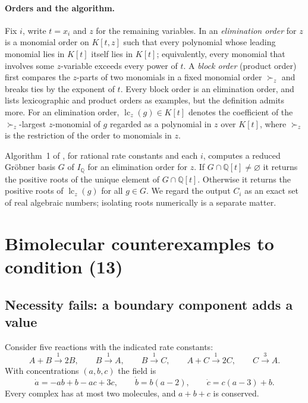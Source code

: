 \documentclass[11pt,a4paper]{article}
\theoremstyle{plain}
\theoremstyle{definition}
\theoremstyle{remark}
\newcommand{\Q}{\mathbb{Q}}
\newcommand{\lc}{\operatorname{lc}}
\begin{document}
\paragraph{Orders and the algorithm.}
Fix $i$, write $t=x_i$ and $z$ for the remaining variables. In \cite[Section~4.1]{acr} an \emph{elimination order} for $z$ is a monomial order on $K[t,z]$ such that every polynomial whose leading monomial lies in $K[t]$ itself lies in $K[t]$; equivalently, every monomial that involves some $z$-variable exceeds every power of $t$. A \emph{block order} (product order) first compares the $z$-parts of two monomials in a fixed monomial order $\succ_z$ and breaks ties by the exponent of $t$. Every block order is an elimination order, and \cite{acr} lists lexicographic and product orders as examples, but the definition admits more. For an elimination order, $\lc_z(g)\in K[t]$ denotes the coefficient of the $\succ_z$-largest $z$-monomial of $g$ regarded as a polynomial in $z$ over $K[t]$, where $\succ_z$ is the restriction of the order to monomials in $z$.

Algorithm~1 of \cite{acr}, for rational rate constants and each $i$, computes a reduced Gr\"obner basis $G$ of $I_\Q$ for an elimination order for $z$. If $G\cap\Q[t]\neq\varnothing$ it returns the positive roots of the unique element of $G\cap\Q[t]$. Otherwise it returns the positive roots of $\lc_z(g)$ for all $g\in G$. We regard the output $C_i$ as an exact set of real algebraic numbers; isolating roots numerically is a separate matter.

\section{Bimolecular counterexamples to condition (13)}\label{sec:counter}

\subsection{Necessity fails: a boundary component adds a value}

Consider five reactions with the indicated rate constants:
\begin{equation}\label{eq:necnet}
A+B\xrightarrow{1}2B,\qquad B\xrightarrow{1}A,\qquad B\xrightarrow{1}C,\qquad A+C\xrightarrow{1}2C,\qquad C\xrightarrow{3}A.
\end{equation}
With concentrations $(a,b,c)$ the field is
\begin{equation}\label{eq:necfield}
\dot a=-ab+b-ac+3c,\qquad \dot b=b(a-2),\qquad \dot c=c(a-3)+b.
\end{equation}
Every complex has at most two molecules, and $a+b+c$ is conserved.
\end{document}
